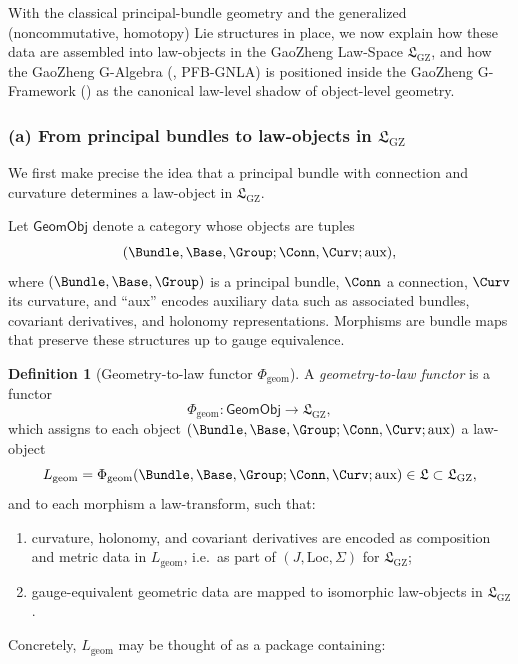 \documentclass[11pt]{book}
\theoremstyle{plain}
\theoremstyle{definition}
\newtheorem{definition}[theorem]{Definition} \theoremstyle{remark}
\newcommand{\GFramework}{\text{G-Framework}} \newcommand{\GAlgebra}{\text{G-Algebra}}
\newcommand{\GZLS}{\ensuremath{\mathfrak{L}_{\mathrm{GZ}}}}       \newcommand{\GZLT}{\ensuremath{M_{!w}}}                           \newcommand{\GZLOC}{\ensuremath{A_M}}                             \newcommand{\GZLCurv}{\ensuremath{\mathcal{F}_{\mathrm{law}}}}
\begin{document}
With the classical principal-bundle geometry and the generalized
(noncommutative, homotopy) Lie structures in place, we now explain how
these data are assembled into law-objects in the GaoZheng Law-Space
\GZLS, and how the GaoZheng G-Algebra (\GAlgebra, PFB-GNLA) is
positioned inside the GaoZheng G-Framework (\GFramework) as the
canonical law-level shadow of object-level geometry.



\subsubsection*{(a) From principal bundles to law-objects in \GZLS}

We first make precise the idea that a principal bundle with connection
and curvature determines a law-object in \GZLS.

Let $\mathsf{GeomObj}$ denote a category whose objects are tuples
\[
   (\Bundle,\Base,\Group;\Conn,\Curv;\text{aux}),
\]
where $(\Bundle,\Base,\Group)$ is a principal bundle, $\Conn$ a
connection, $\Curv$ its curvature, and “aux” encodes auxiliary data
such as associated bundles, covariant derivatives, and holonomy
representations. Morphisms are bundle maps that preserve these
structures up to gauge equivalence.

\begin{definition}[Geometry-to-law functor \texorpdfstring{$\Phi_{\mathrm{geom}}$}{Phi\_geom}]
A \emph{geometry-to-law functor} is a functor
  \[
     \Phi_{\mathrm{geom}}:
       \mathsf{GeomObj}\longrightarrow\GZLS,
  \]
  which assigns to each object
  $(\Bundle,\Base,\Group;\Conn,\Curv;\text{aux})$ a law-object
  \[
     L_{\mathrm{geom}}
     =
     \Phi_{\mathrm{geom}}
       (\Bundle,\Base,\Group;\Conn,\Curv;\text{aux})
     \in \mathfrak{L}\subset\GZLS,
  \]
  and to each morphism a law-transform, such that:
  \begin{enumerate}[label=\roman*)]
    \item curvature, holonomy, and covariant derivatives are encoded as
          composition and metric data in $L_{\mathrm{geom}}$, i.e.\ as
          part of $(J,\mathrm{Loc},\Sigma)$ for \GZLS;
    \item gauge-equivalent geometric data are mapped to isomorphic
          law-objects in \GZLS.
  \end{enumerate}
\end{definition}

Concretely, $L_{\mathrm{geom}}$ may be thought of as a package
containing:
\end{document}

